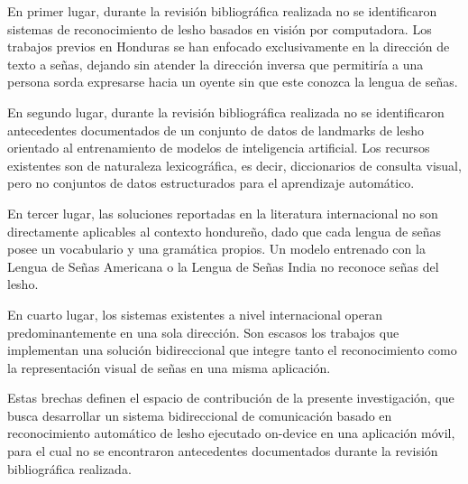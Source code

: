 En primer lugar, durante la revisión bibliográfica realizada no se identificaron sistemas
de reconocimiento de \acrshort{lesho} basados en visión por computadora. Los trabajos previos en
Honduras se han enfocado exclusivamente en la dirección de texto a señas, dejando sin
atender la dirección inversa que permitiría a una persona sorda expresarse hacia un
oyente sin que este conozca la lengua de señas.

En segundo lugar, durante la revisión bibliográfica realizada no se identificaron
antecedentes documentados de un conjunto de datos de landmarks de \acrshort{lesho} orientado al
entrenamiento de modelos de inteligencia artificial. Los recursos existentes son de
naturaleza lexicográfica, es decir, diccionarios de consulta visual, pero no conjuntos de
datos estructurados para el aprendizaje automático.

En tercer lugar, las soluciones reportadas en la literatura internacional no son
directamente aplicables al contexto hondureño, dado que cada lengua de señas posee un
vocabulario y una gramática propios. Un modelo entrenado con la Lengua de Señas
Americana o la Lengua de Señas India no reconoce señas del \acrshort{lesho}.

En cuarto lugar, los sistemas existentes a nivel internacional operan predominantemente
en una sola dirección. Son escasos los trabajos que implementan una solución bidireccional
que integre tanto el reconocimiento como la representación visual de señas en una misma
aplicación.

Estas brechas definen el espacio de contribución de la presente investigación, que busca
desarrollar un sistema bidireccional de comunicación basado en reconocimiento automático
de \acrshort{lesho} ejecutado on-device en una aplicación móvil, para el cual no se encontraron
antecedentes documentados durante la revisión bibliográfica realizada.
